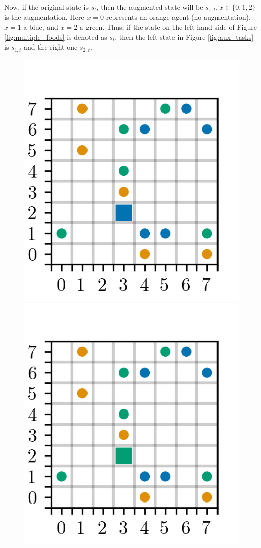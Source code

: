 \documentclass[12pt,A4]{report}
\theoremstyle{definition}
\begin{document}
Now, if the original state is $s_t$, then the augmented state will be $s_{x,t}, x \in \{0, 1, 2\}$ is the augmentation. Here $x=0$ represents an orange agent (no augmentation), $x=1$ a blue, and $x=2$ a green. Thus, if the state on the left-hand side of Figure \ref{fig:multiple_foods} is denoted as $s_t$, then the left state in Figure \ref{fig:aux_tasks} is $s_{1,t}$ and the right one $s_{2,t}$.

\begin{figure}[H]
  \centering
  \includegraphics{"figures/aux_1.png"}
  \includegraphics{"figures/aux_2.png"}

\end{figure}
\end{document}
